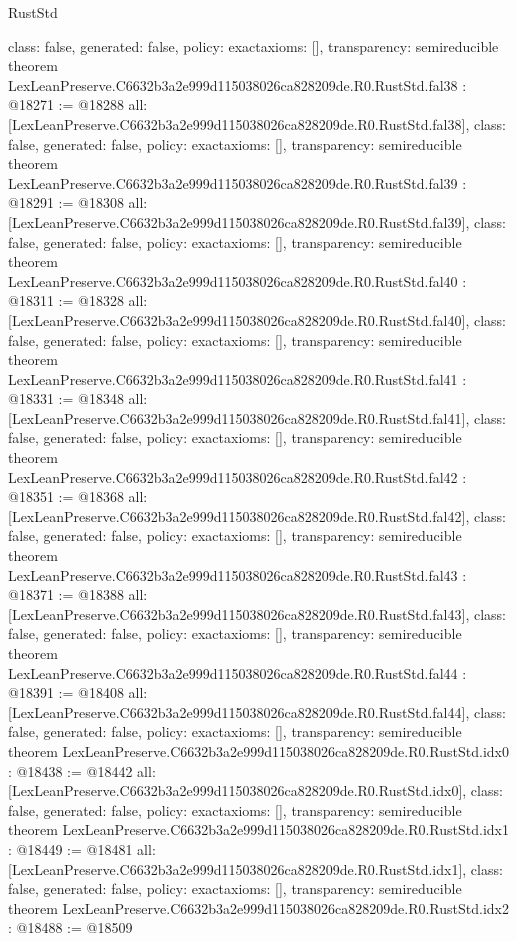 \begin{lexlean}{RustStd}
\begin{coremodule}
{  class: false,
  generated: false,
  policy: exact{axioms: []},
  transparency: semireducible
}
theorem LexLeanPreserve.C6632b3a2e999d115038026ca828209de.R0.RustStd.fal38 : @18271 := @18288 {
  all: [LexLeanPreserve.C6632b3a2e999d115038026ca828209de.R0.RustStd.fal38],
  class: false,
  generated: false,
  policy: exact{axioms: []},
  transparency: semireducible
}
theorem LexLeanPreserve.C6632b3a2e999d115038026ca828209de.R0.RustStd.fal39 : @18291 := @18308 {
  all: [LexLeanPreserve.C6632b3a2e999d115038026ca828209de.R0.RustStd.fal39],
  class: false,
  generated: false,
  policy: exact{axioms: []},
  transparency: semireducible
}
theorem LexLeanPreserve.C6632b3a2e999d115038026ca828209de.R0.RustStd.fal40 : @18311 := @18328 {
  all: [LexLeanPreserve.C6632b3a2e999d115038026ca828209de.R0.RustStd.fal40],
  class: false,
  generated: false,
  policy: exact{axioms: []},
  transparency: semireducible
}
theorem LexLeanPreserve.C6632b3a2e999d115038026ca828209de.R0.RustStd.fal41 : @18331 := @18348 {
  all: [LexLeanPreserve.C6632b3a2e999d115038026ca828209de.R0.RustStd.fal41],
  class: false,
  generated: false,
  policy: exact{axioms: []},
  transparency: semireducible
}
theorem LexLeanPreserve.C6632b3a2e999d115038026ca828209de.R0.RustStd.fal42 : @18351 := @18368 {
  all: [LexLeanPreserve.C6632b3a2e999d115038026ca828209de.R0.RustStd.fal42],
  class: false,
  generated: false,
  policy: exact{axioms: []},
  transparency: semireducible
}
theorem LexLeanPreserve.C6632b3a2e999d115038026ca828209de.R0.RustStd.fal43 : @18371 := @18388 {
  all: [LexLeanPreserve.C6632b3a2e999d115038026ca828209de.R0.RustStd.fal43],
  class: false,
  generated: false,
  policy: exact{axioms: []},
  transparency: semireducible
}
theorem LexLeanPreserve.C6632b3a2e999d115038026ca828209de.R0.RustStd.fal44 : @18391 := @18408 {
  all: [LexLeanPreserve.C6632b3a2e999d115038026ca828209de.R0.RustStd.fal44],
  class: false,
  generated: false,
  policy: exact{axioms: []},
  transparency: semireducible
}
theorem LexLeanPreserve.C6632b3a2e999d115038026ca828209de.R0.RustStd.idx0 : @18438 := @18442 {
  all: [LexLeanPreserve.C6632b3a2e999d115038026ca828209de.R0.RustStd.idx0],
  class: false,
  generated: false,
  policy: exact{axioms: []},
  transparency: semireducible
}
theorem LexLeanPreserve.C6632b3a2e999d115038026ca828209de.R0.RustStd.idx1 : @18449 := @18481 {
  all: [LexLeanPreserve.C6632b3a2e999d115038026ca828209de.R0.RustStd.idx1],
  class: false,
  generated: false,
  policy: exact{axioms: []},
  transparency: semireducible
}
theorem LexLeanPreserve.C6632b3a2e999d115038026ca828209de.R0.RustStd.idx2 : @18488 := @18509 {
}
\end{coremodule}
\end{lexlean}
